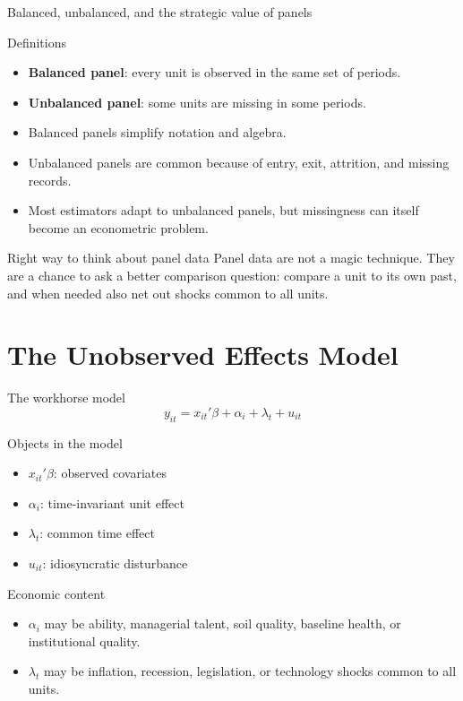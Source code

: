 \documentclass[10pt]{beamer}
\begin{document}
\begin{frame}{Balanced, unbalanced, and the strategic value of panels}
\label{slide:balanced}
\small
\begin{block}{Definitions}
\begin{itemize}
  \item \textbf{Balanced panel}: every unit is observed in the same set of periods.
  \item \textbf{Unbalanced panel}: some units are missing in some periods.
\end{itemize}
\end{block}

\pause
\begin{itemize}
  \item Balanced panels simplify notation and algebra.
  \item Unbalanced panels are common because of entry, exit, attrition, and missing records.
  \item Most estimators adapt to unbalanced panels, but missingness can itself become an econometric problem.
\end{itemize}

\pause
\begin{alertblock}{Right way to think about panel data}
Panel data are not a magic technique. They are a chance to ask a better comparison question: compare a unit to its own past, and when needed also net out shocks common to all units.
\end{alertblock}
\end{frame}

\section{The Unobserved Effects Model}

\begin{frame}{The workhorse model}
\label{slide:uem}
\[
y_{it} = x_{it}'\beta + \alpha_i + \lambda_t + u_{it}
\]

\begin{block}{Objects in the model}
\begin{itemize}
  \item $x_{it}'\beta$: observed covariates
  \item $\alpha_i$: time-invariant unit effect
  \item $\lambda_t$: common time effect
  \item $u_{it}$: idiosyncratic disturbance
\end{itemize}
\end{block}

\pause
\begin{exampleblock}{Economic content}
\begin{itemize}
  \item $\alpha_i$ may be ability, managerial talent, soil quality, baseline health, or institutional quality.
  \item $\lambda_t$ may be inflation, recession, legislation, or technology shocks common to all units.
\end{itemize}
\end{exampleblock}
\end{frame}
\end{document}
